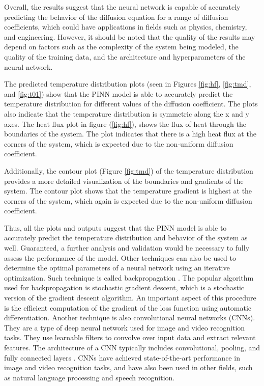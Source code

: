 Overall, the results suggest that the neural network is capable of accurately predicting the behavior of the diffusion equation for a range of diffusion coefficients, which could have applications in fields such as physics, chemistry, and engineering. However, it should be noted that the quality of the results may depend on factors such as the complexity of the system being modeled, the quality of the training data, and the architecture and hyperparameters of the neural network.

The predicted temperature distribution plots (seen in Figures \ref{fig:hf}, \ref{fig:tmd}, and \ref{fig:t01}) show that the PINN model is able to accurately predict the temperature distribution for different values of the diffusion coefficient. The plots also indicate that the temperature distribution is symmetric along the x and y axes. The heat flux plot in figure (\ref{fig:hf}), shows the flux of heat through the boundaries of the system. The plot indicates that there is a high heat flux at the corners of the system, which is expected due to the non-uniform diffusion coefficient.

Additionally, the contour plot (Figure \ref{fig:tmd}) of the temperature distribution provides a more detailed visualization of the boundaries and gradients of the system. The contour plot shows that the temperature gradient is highest at the corners of the system, which again is expected due to the non-uniform diffusion coefficient.

Thus, all the plots and outputs suggest that the PINN model is able to accurately predict the temperature distribution and behavior of the system as well. Guaranteed, a further analysis and validation would be necessary to fully assess the performance of the model. Other techniques can also be used to determine the optimal parameters of a neural network using an iterative optimization. Such technique is called backpropagation \cite{Sukumar2022}. The popular algorithm used for backpropagation is stochastic gradient descent, which is a stochastic version of the gradient descent algorithm. An important aspect of this procedure is the efficient computation of the gradient of the loss function using automatic differentiation. Another technique is also convolutional neural networks (CNNs). They are a type of deep neural network used for image and video recognition tasks. They use learnable filters to convolve over input data and extract relevant features. The architecture of a CNN typically includes convolutional, pooling, and fully connected layers \cite{Srivastava2018}. CNNs have achieved state-of-the-art performance in image and video recognition tasks, and have also been used in other fields, such as natural language processing and speech recognition.

